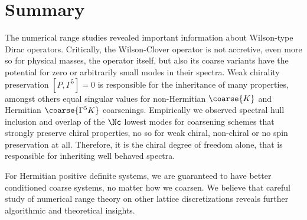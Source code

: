 \section{Summary}
\label{sec:chirality:summary}



The numerical range studies revealed important information about Wilson-type Dirac operators.
Critically, the Wilson-Clover operator is not accretive, even more so for physical masses, \ie the operator itself, but also its coarse variants have the potential for zero or arbitrarily small modes in their spectra.
Weak chirality preservation $[P, \Gamma^{5}]=0$ is responsible for the inheritance of many properties, amongst others equal singular values for non-Hermitian $\coarse{K}$ and Hermitian $\coarse{\Gamma^{5} K}$ coarsenings.
Empirically we observed spectral hull inclusion and overlap of the $\Nc$ lowest modes for coarsening schemes that strongly preserve chiral properties, no so for weak chiral, non-chiral or no spin preservation at all.
Therefore, it is the chiral degree of freedom alone, that is responsible for inheriting well behaved spectra.


For Hermitian positive definite systems, we are guaranteed to have better conditioned coarse systems, no matter how we coarsen.
We believe that careful study of numerical range theory on other lattice discretizations reveals further algorithmic and theoretical insights.

